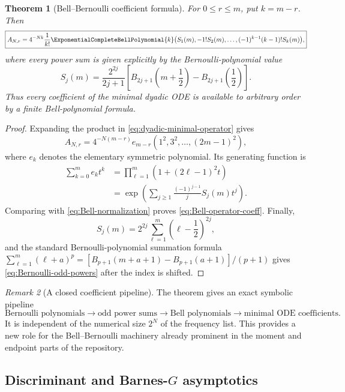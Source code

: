 \documentclass[11pt]{article}
\numberwithin{equation}{section}
\newtheorem{theorem}{Theorem}[section]
\theoremstyle{definition}
\theoremstyle{remark}
\newtheorem{remark}[theorem]{Remark}
\begin{document}
\begin{theorem}[Bell--Bernoulli coefficient formula]
\label{thm:Bell-Bernoulli-operator}
For $0\le r\le m$, put $k=m-r$.  Then
\begin{equation}
 \boxed{
 A_{N,r}=4^{-Nk}\frac{1}{k!}
 \ExponentialCompleteBellPolynomial{k}\bigl(S_1(m),-1!S_2(m),\ldots,
              (-1)^{k-1}(k-1)!S_k(m)\bigr),}
 \label{eq:Bell-operator-coeff}
\end{equation}
where every power sum is given explicitly by the Bernoulli-polynomial value
\begin{equation}
 \boxed{
 S_j(m)=\frac{2^{2j}}{2j+1}
 \left[B_{2j+1}\!\left(m+\frac12\right)
       -B_{2j+1}\!\left(\frac12\right)\right].}
 \label{eq:Bernoulli-odd-powers}
\end{equation}
Thus every coefficient of the minimal dyadic ODE is available to arbitrary
order by a finite Bell-polynomial formula.
\end{theorem}
\begin{proof}
Expanding the product in \eqref{eq:dyadic-minimal-operator} gives
\[
 A_{N,r}=4^{-N(m-r)}e_{m-r}(1^2,3^2,\ldots,(2m-1)^2),
\]
where $e_k$ denotes the elementary symmetric polynomial.  Its generating
function is
\begin{align*}
 \sum_{k=0}^{m}e_kt^k
 &=\prod_{\ell=1}^{m}\left(1+(2\ell-1)^2t\right)\\
 &=\exp\left(\sum_{j\ge1}
       \frac{(-1)^{j-1}}{j}S_j(m)t^j\right).
\end{align*}
Comparing with \eqref{eq:Bell-normalization} proves
\eqref{eq:Bell-operator-coeff}.  Finally,
\[
 S_j(m)=2^{2j}\sum_{\ell=1}^{m}
 \left(\ell-\frac12\right)^{2j},
\]
and the standard Bernoulli-polynomial summation formula
\(
 \sum_{\ell=1}^{m}(\ell+a)^{p}
 =[B_{p+1}(m+a+1)-B_{p+1}(a+1)]/(p+1)
\)
gives \eqref{eq:Bernoulli-odd-powers} after the index is shifted.
\end{proof}

\begin{remark}[A closed coefficient pipeline]
The theorem gives an exact symbolic pipeline
\[
 \text{Bernoulli polynomials}
 \longrightarrow \text{odd power sums}
 \longrightarrow \text{Bell polynomials}
 \longrightarrow \text{minimal ODE coefficients}.
\]
It is independent of the numerical size $2^N$ of the frequency list.  This
provides a new role for the Bell--Bernoulli machinery already prominent in the
moment and endpoint parts of the repository.
\end{remark}

\subsection{Discriminant and Barnes-\texorpdfstring{$G$}{G} asymptotics}
\end{document}
